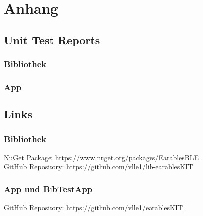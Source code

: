 \documentclass[a4paper,12pt]{article}
\begin{document}
\section{Anhang}
\subsection{Unit Test Reports}
\subsubsection{Bibliothek}
\subsubsection{App}

\subsection{Links}
\subsubsection{Bibliothek}
NuGet Package: \url{https://www.nuget.org/packages/EarablesBLE}\\
GitHub Repository: \url{https://github.com/vlle1/lib-earablesKIT}
\subsubsection{App und BibTestApp}
GitHub Repository: \url{https://github.com/vlle1/earablesKIT}


\printglossaries
{}
\end{document}
